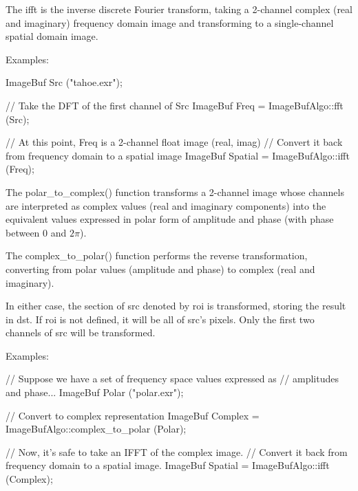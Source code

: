The {\cf ifft} is the inverse discrete Fourier transform, taking a 2-channel
complex (real and imaginary) frequency domain image and transforming to a
single-channel spatial domain image.

\smallskip
\noindent Examples:
\begin{code}
    ImageBuf Src ("tahoe.exr");

    // Take the DFT of the first channel of Src
    ImageBuf Freq = ImageBufAlgo::fft (Src);

    // At this point, Freq is a 2-channel float image (real, imag)
    // Convert it back from frequency domain to a spatial image
    ImageBuf Spatial = ImageBufAlgo::ifft (Freq);
\end{code}
\apiend

 
 

The {\cf polar_to_complex()} function transforms a 2-channel image whose
channels are interpreted as complex values (real and imaginary components)
into the equivalent values expressed in polar form of amplitude and phase
(with phase between $0$ and $2\pi$).

The {\cf complex_to_polar()} function performs the reverse transformation,
converting from  polar values (amplitude and phase) to complex (real and
imaginary).

In either case,  the section of {\cf src} denoted by {\cf roi} is
transformed, storing the result in {\cf dst}. If {\cf roi} is not defined,
it will be all of {\cf src}'s pixels.  Only the first two channels of {\cf
src} will be transformed.

\smallskip
\noindent Examples:
\begin{code}
    // Suppose we have a set of frequency space values expressed as
    // amplitudes and phase...
    ImageBuf Polar ("polar.exr");

    // Convert to complex representation
    ImageBuf Complex = ImageBufAlgo::complex_to_polar (Polar);

    // Now, it's safe to take an IFFT of the complex image.
    // Convert it back from frequency domain to a spatial image.
    ImageBuf Spatial = ImageBufAlgo::ifft (Complex);
\end{code}
\apiend



